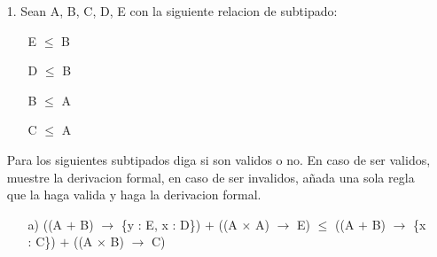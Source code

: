 \documentclass{article}
\begin{document}
    \begin{itemize}
        \item[1.] Sean A, B, C, D, E con la siguiente relacion de subtipado:
        \begin{center}
            \begin{itemize}
                \item[ ] E $\leq$ B
                \item[ ] D $\leq$ B
                \item[ ] B $\leq$ A
                \item[ ] C $\leq$ A 
            \end{itemize}
        \end{center}

        Para los siguientes subtipados diga si son validos o no. En caso de ser validos, muestre la derivacion formal, en caso de ser invalidos, añada una sola regla que la haga valida y haga la derivacion formal.

        \begin{itemize}
            \item[a)] ((A $+$ B) $\rightarrow$ \{y : E, x : D\}) $+$ ((A $×$ A) $\rightarrow$ E) $\leq$ ((A $+$ B) $\rightarrow$ \{x : C\}) $+$ ((A × B) $\rightarrow$ C)


\end{itemize}
\end{itemize}
\end{document}

